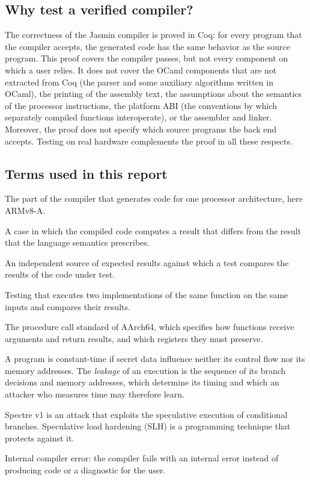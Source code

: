 \documentclass[11pt,a4paper]{article}
\begin{document}
\subsection{Why test a verified compiler?}

The correctness of the Jasmin compiler is proved in Coq: for every program
that the compiler accepts, the generated code has the same behavior as the
source program.
This proof covers the compiler passes, but not every component on which a
user relies. It does not cover the OCaml components that are not extracted
from Coq (the parser and some auxiliary algorithms written in OCaml), the
printing of the
assembly text, the assumptions about the semantics of the processor
instructions, the platform ABI (the conventions by which separately compiled
functions interoperate), or the assembler and linker. Moreover, the proof
does not specify which source programs the back end accepts. Testing on real
hardware complements the proof in all these respects.

\subsection{Terms used in this report}

\begin{description}[leftmargin=0pt,itemsep=2pt]
  \item[Back end] The part of the compiler that generates code for one
        processor architecture, here ARMv8-A.
  \item[Miscompilation] A case in which the compiled code computes a result
        that differs from the result that the language semantics
        prescribes.
  \item[Oracle] An independent source of expected results against which a
        test compares the results of the code under test.
  \item[Differential testing] Testing that executes two implementations of
        the same function on the same inputs and compares their results.
  \item[AAPCS64] The procedure call standard of AArch64, which specifies how
        functions receive arguments and return results, and which registers
        they must preserve.
  \item[Constant time, leakage] A program is constant-time if secret data
        influence neither its control flow nor its memory addresses. The
        \emph{leakage} of an execution is the sequence of its branch
        decisions and memory addresses, which determine its timing and which
        an attacker who measures time may therefore learn.
  \item[Spectre v1, SLH] Spectre v1 is an attack that exploits the
        speculative execution of conditional branches. Speculative load
        hardening (SLH) is a programming technique that protects against
        it.
  \item[ICE] Internal compiler error: the compiler fails with an internal
        error instead of producing code or a diagnostic for the user.
\end{description}
\end{document}
